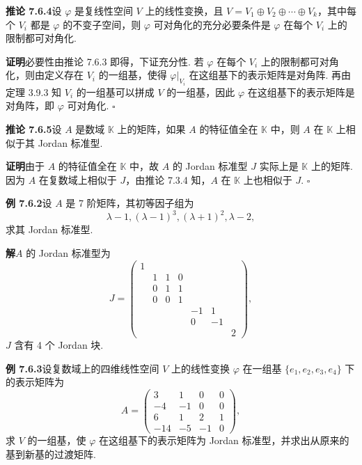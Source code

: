 \documentclass[UTF8,12pt,a4paper,fontset=fandol]{ctexart}
\begin{document}
\noindent\textbf{推论 7.6.4}\quad 设 $\varphi$ 是复线性空间 $V$ 上的线性变换，且 $V=V_1\oplus V_2\oplus\cdots\oplus V_k$，其中每个 $V_i$ 都是 $\varphi$ 的不变子空间，则 $\varphi$ 可对角化的充分必要条件是 $\varphi$ 在每个 $V_i$ 上的限制都可对角化.

\noindent\textbf{证明}\quad 必要性由推论 7.6.3 即得，下证充分性. 若 $\varphi$ 在每个 $V_i$ 上的限制都可对角化，则由定义存在 $V_i$ 的一组基，使得 $\varphi|_{V_i}$ 在这组基下的表示矩阵是对角阵. 再由定理 3.9.3 知 $V_i$ 的一组基可以拼成 $V$ 的一组基，因此 $\varphi$ 在这组基下的表示矩阵是对角阵，即 $\varphi$ 可对角化. $\square$

\noindent\textbf{推论 7.6.5}\quad 设 $A$ 是数域 $\mathbb{K}$ 上的矩阵，如果 $A$ 的特征值全在 $\mathbb{K}$ 中，则 $A$ 在 $\mathbb{K}$ 上相似于其 Jordan 标准型.

\noindent\textbf{证明}\quad 由于 $A$ 的特征值全在 $\mathbb{K}$ 中，故 $A$ 的 Jordan 标准型 $J$ 实际上是 $\mathbb{K}$ 上的矩阵. 因为 $A$ 在复数域上相似于 $J$，由推论 7.3.4 知，$A$ 在 $\mathbb{K}$ 上也相似于 $J$. $\square$

\noindent\textbf{例 7.6.2}\quad 设 $A$ 是 7 阶矩阵，其初等因子组为
\[
\lambda-1,(\lambda-1)^3,(\lambda+1)^2,\lambda-2,
\]
求其 Jordan 标准型.

\noindent\textbf{解}\quad $A$ 的 Jordan 标准型为
\[
J=\left(\begin{array}{ccccccc}
1 & & & & & & \\
& 1 & 1 & 0 & & & \\
& 0 & 1 & 1 & & & \\
& 0 & 0 & 1 & & & \\
& & & & -1 & 1 & \\
& & & & 0 & -1 & \\
& & & & & & 2
\end{array}\right),
\]
$J$ 含有 4 个 Jordan 块.

\noindent\textbf{例 7.6.3}\quad 设复数域上的四维线性空间 $V$ 上的线性变换 $\varphi$ 在一组基 $\{e_1,e_2,e_3,e_4\}$ 下的表示矩阵为
\[
A=\left(\begin{array}{cccc}
3 & 1 & 0 & 0\\
-4 & -1 & 0 & 0\\
6 & 1 & 2 & 1\\
-14 & -5 & -1 & 0
\end{array}\right),
\]
求 $V$ 的一组基，使 $\varphi$ 在这组基下的表示矩阵为 Jordan 标准型，并求出从原来的基到新基的过渡矩阵.
\end{document}
